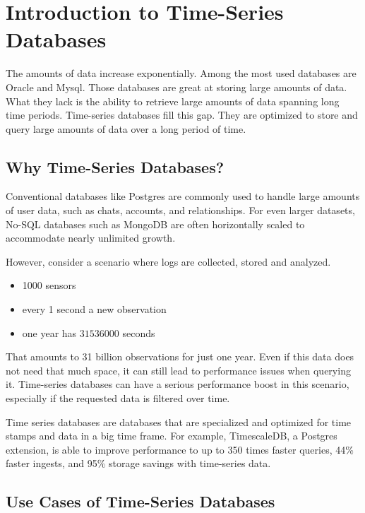 \chapter{Introduction to Time-Series Databases}\label{chap:benjamin-introduction}

The amounts of data increase exponentially. Among the most used databases are
Oracle and Mysql. Those databases are great at storing large amounts of data.
What they lack is the ability to retrieve large amounts of data spanning long
time periods. Time-series databases fill this gap. They are optimized to store
and query large amounts of data over a long period of time.

\section{Why Time-Series Databases?}\label{why-time-series-databases}

Conventional databases like Postgres are commonly used to handle large amounts
of user data, such as chats, accounts, and relationships. For even larger
datasets, No-SQL databases such as MongoDB are often horizontally scaled to
accommodate nearly unlimited growth.

However, consider a scenario where logs are collected, stored and analyzed.

\begin{itemize}
  \item
        1000 sensors
  \item
        every 1 second a new observation
  \item
        one year has \(31536000\) seconds
\end{itemize}


That amounts to 31 billion observations for just one year. Even if this data
does not need that much space, it can still lead to performance issues when
querying it. Time-series databases can have a serious performance boost in this
scenario, especially if the requested data is filtered over time.

Time series databases are databases that are specialized and optimized for time
stamps and data in a big time frame. For example, TimescaleDB, a Postgres
extension, is able to improve performance to up to 350 times faster queries,
44\% faster ingests, and 95\% storage savings with time-series data.~\cite{TimescaleDB:01}

\section{Use Cases of Time-Series Databases}\label{use-cases-of-time-series-databases}

